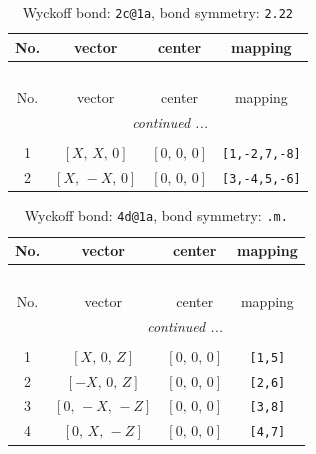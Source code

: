 \documentclass[fleqn,8pt]{jsarticle}
\begin{document}
\renewcommand{\arraystretch}{1.2}
\begin{longtable}{cccc}
\caption{Wyckoff bond: {\tt 2c@1a}, bond symmetry: {\tt 2.22}}
 \\
 \hline \hline
No. & vector & center & mapping \\ \hline \endfirsthead

\multicolumn{3}{l}{\tablename\ \thetable{}} \\
 \hline \hline
No. & vector & center & mapping \\ \hline \endhead

 \hline \hline
\multicolumn{3}{r}{\footnotesize\it continued ...} \\ \endfoot

 \hline \hline
\multicolumn{3}{r}{} \\ \endlastfoot

1 & $\left[ X,\, X,\, 0 \right]$ & $\left[ 0,\, 0,\, 0 \right]$ & {\tt [1,-2,7,-8]} \\ \hline
2 & $\left[ X,\, - X,\, 0 \right]$ & $\left[ 0,\, 0,\, 0 \right]$ & {\tt [3,-4,5,-6]} \\
\end{longtable}
\renewcommand{\arraystretch}{1.2}
\begin{longtable}{cccc}
\caption{Wyckoff bond: {\tt 4d@1a}, bond symmetry: {\tt .m.}}
 \\
 \hline \hline
No. & vector & center & mapping \\ \hline \endfirsthead

\multicolumn{3}{l}{\tablename\ \thetable{}} \\
 \hline \hline
No. & vector & center & mapping \\ \hline \endhead

 \hline \hline
\multicolumn{3}{r}{\footnotesize\it continued ...} \\ \endfoot

 \hline \hline
\multicolumn{3}{r}{} \\ \endlastfoot

1 & $\left[ X,\, 0,\, Z \right]$ & $\left[ 0,\, 0,\, 0 \right]$ & {\tt [1,5]} \\ \hline
2 & $\left[ - X,\, 0,\, Z \right]$ & $\left[ 0,\, 0,\, 0 \right]$ & {\tt [2,6]} \\ \hline
3 & $\left[ 0,\, - X,\, - Z \right]$ & $\left[ 0,\, 0,\, 0 \right]$ & {\tt [3,8]} \\ \hline
4 & $\left[ 0,\, X,\, - Z \right]$ & $\left[ 0,\, 0,\, 0 \right]$ & {\tt [4,7]} \\
\end{longtable}
\end{document}
